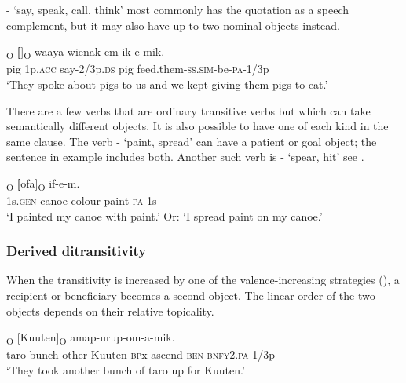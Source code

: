- `say, speak, call, think' most commonly has the quotation as a speech complement, but it may also have up to two nominal objects instead.

\ea%
\label{ex:5:x956}
\textsubscript{O}  \textbf{[}]\textsubscript{O}    waaya  wienak-em-ik-e-mik. \\
     pig  1p.\textsc{acc}  say-2/3p.\textsc{ds}  pig  feed.them-\textsc{ss}.\textsc{sim}-be-\textsc{pa}-1/3p \\
\glt `They spoke about pigs to us and we kept giving them pigs to eat.'
\z

There are a few verbs that are ordinary transitive verbs but which can take semantically different objects. It is also possible to have one of each kind in the same clause. The verb - `paint, spread' can have a patient or goal object; the sentence in example  includes both. Another such verb is \nobreakdash- `spear, hit' see .  

\ea%
\label{ex:5:x944}
\textsubscript{O}  \textbf{[}ofa]\textsubscript{O}  if-e-m. \\
     1s.\textsc{gen}  canoe  colour  paint-\textsc{pa}-1s \\
\glt `I painted my canoe with paint.' Or: `I spread paint on my canoe.'
\z

\subsubsection[Derived ditransitivity ]{Derived ditransitivity} \label{sec:5.3.2.2}

When the transitivity is increased by one of the valence-increasing strategies (), a recipient or beneficiary  becomes a second object. The linear order of the two objects depends on their relative topicality.

\ea%
\label{ex:5:x947}
\textsubscript{O}  [Kuuten]\textsubscript{O}  amap-urup-om-a-mik. \\
     taro  bunch  other  Kuuten  \textsc{bp}x-ascend-\textsc{ben}-\textsc{bnfy}2.\textsc{pa}-1/3p \\
\glt `They took another bunch of taro up for Kuuten.'
\z


